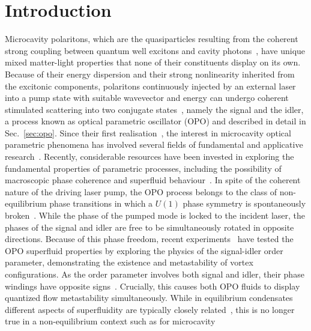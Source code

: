 \chapter{Introduction}

Microcavity polaritons, which are the quasiparticles resulting from
the coherent strong coupling between quantum well excitons and cavity
photons~\cite{9780199228942}, have unique mixed matter-light
properties that none of their constituents display on its own.
Because of their energy dispersion and their strong nonlinearity
inherited from the excitonic components, polaritons continuously
injected by an external laser into a pump state with suitable
wavevector and energy can undergo coherent stimulated scattering into
two conjugate states~\cite{Ciuti_2000,Ciuti_2001,Ciuti_2003}, namely
the signal and the idler, a process known as optical parametric
oscillator (OPO) and described in detail in Sec.~\ref{sec:opo}.
%
Since their first realisation~\cite{Stevenson_2000, Savvidis_2000,
Savvidis_2000_b, Baumberg_2000, Saba_2001}, the interest in
microcavity optical parametric phenomena has involved several fields
of fundamental and applicative research~\cite{Edamatsu_2004,
Savasta_2005, Lanco_2006, Abbarchi_2011, Ardizzone_2012, Xie_2012,
Lecomte_2013}.
%
Recently, considerable resources have been invested in exploring the
fundamental properties of parametric processes, including the
possibility of macroscopic phase coherence and superfluid
behaviour~\cite{Carusotto_2013}.  In spite of the coherent nature of
the driving laser pump, the OPO process belongs to the class of
non-equilibrium phase transitions in which a $U(1)$ phase symmetry is
spontaneously broken~\cite{Wouters_2007}.  While the phase of the
pumped mode is locked to the incident laser, the phases of the signal
and idler are free to be simultaneously rotated in opposite
directions.  Because of this phase freedom, recent
experiments~\cite{Sanvitto_2010} have tested the OPO superfluid
properties by exploring the physics of the signal-idler order
parameter, demonstrating the existence and metastability of vortex
configurations. As the order parameter involves both signal and idler,
their phase windings have opposite
signs~\cite{Sanvitto_2010,Marchetti_2010,9783642241857}. Crucially,
this causes both OPO fluids to display quantized flow metastability
simultaneously.
%
While in equilibrium condensates different aspects of superfluidity
are typically closely related~\cite{Leggett_1999}, this is no longer
true in a non-equilibrium context such as for microcavity
